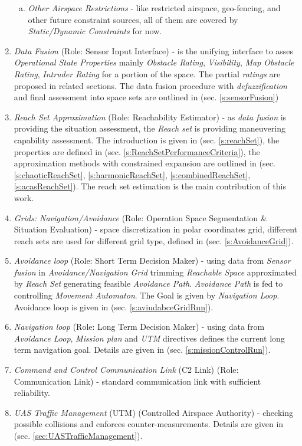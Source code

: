\begin{enumerate}
\begin{enumerate}[a.]
            \item \emph{Other Airspace Restrictions} - like restricted airspace, geo-fencing, and other future constraint sources, all of them are covered by \emph{Static/Dynamic Constraints} for now.
        \end{enumerate}
    
    \item \emph{Data Fusion} (Role: Sensor Input Interface) - is the unifying interface to asses \emph{Operational State Properties} mainly \emph{Obstacle Rating}, \emph{Visibility}, \emph{Map Obstacle Rating}, \emph{Intruder Rating} for a portion of the space. The partial \emph{ratings} are proposed in related sections. The data fusion procedure with \emph{defuzzification} and final assessment into space sets are outlined in (sec. \ref{s:sensorFusion})  
    
    \item \emph{Reach Set Approximation} (Role: Reachability Estimator) - as \emph{data fusion} is providing the situation assessment, the \emph{Reach set} is providing maneuvering capability assessment. The introduction is given in (sec. \ref{s:reachSet}), the properties are defined in (sec. \ref{s:ReachSetPerformanceCriteria}), the approximation methods with constrained expansion are outlined in (sec. \ref{s:chaoticReachSet}, \ref{s:harmonicReachSet}, \ref{s:combinedReachSet}, \ref{s:acasReachSet}). The reach set estimation is the main contribution of this work.
    
    \item \emph{Grids: Navigation/Avoidance} (Role: Operation Space Segmentation \& Situation Evaluation) - space discretization in polar coordinates grid, different reach sets are used for different grid type, defined in (sec. \ref{s:AvoidanceGrid}).
    
    \item \emph{Avoidance loop} (Role: Short Term Decision Maker) - using data from \emph{Sensor fusion} in \emph{Avoidance/Navigation Grid} trimming \emph{Reachable Space} approximated by \emph{Reach Set} generating feasible \emph{Avoidance Path}. \emph{Avoidance Path} is fed to controlling \emph{Movement Automaton}. The Goal is given by \emph{Navigation Loop}. Avoidance loop is given in (sec. \ref{s:aviudabceGridRun}).
    
    \item \emph{Navigation loop} (Role: Long Term Decision Maker) - using data from \emph{Avoidance Loop}, \emph{Mission plan} and \emph{UTM} directives defines the current long term navigation goal. Details are given in (sec. \ref{s:missionControlRun}).
    
    \item \emph{Command and Control Communication Link} (C2 Link) (Role: Communication Link) - standard communication link with sufficient reliability.
    
    \item \emph{UAS Traffic Management} (UTM) (Controlled Airspace Authority) - checking possible collisions and enforces counter-measurements. Details are given in (sec. \ref{sec:UASTrafficManagement}).
    
\end{enumerate}
